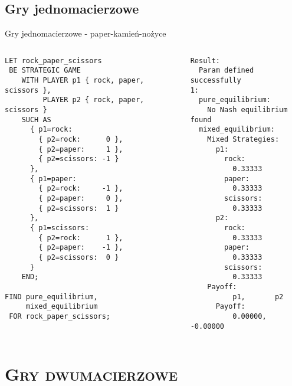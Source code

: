 \documentclass[xcolor=x11names,compress]{beamer}
\renewcommand{\(}{\begin{columns}}
\renewcommand{\)}{\end{columns}}
\newcommand{\<}[1]{\begin{column}{#1}}
\renewcommand{\>}{\end{column}}
\begin{document}
\subsection{Gry jednomacierzowe}
\begin{frame}[fragile]{Gry jednomacierzowe - paper-kamień-nożyce}
\begin{columns}[c]
\begin{column}{.5\textwidth}
\begin{lstlisting}
LET rock_paper_scissors
 BE STRATEGIC GAME
    WITH PLAYER p1 { rock, paper, scissors },
         PLAYER p2 { rock, paper, scissors }
    SUCH AS
      { p1=rock:
        { p2=rock:      0 },
        { p2=paper:     1 },
        { p2=scissors: -1 }
      },
      { p1=paper:
        { p2=rock:     -1 },
        { p2=paper:     0 },
        { p2=scissors:  1 }
      },
      { p1=scissors:
        { p2=rock:      1 },
        { p2=paper:    -1 },
        { p2=scissors:  0 }
      }
    END;

FIND pure_equilibrium,
     mixed_equilibrium
 FOR rock_paper_scissors;
\end{lstlisting}
\end{column}
\vrule
\begin{column}{.5\textwidth}
\begin{lstlisting}
Result:
  Param defined successfully
1:
  pure_equilibrium:
    No Nash equilibrium found
  mixed_equilibrium:
    Mixed Strategies:
      p1:
        rock:
          0.33333
        paper:
          0.33333
        scissors:
          0.33333
      p2:
        rock:
          0.33333
        paper:
          0.33333
        scissors:
          0.33333
    Payoff:
          p1,       p2
      Payoff:
          0.00000,  -0.00000
\end{lstlisting}
\end{column}
\end{columns}
\end{frame}


\section{\scshape Gry dwumacierzowe}
\end{document}
